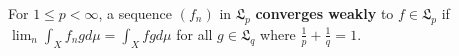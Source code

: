 For $1 \leq p < \infty$, a sequence $(f_n)$ in $\mathfrak{L}_p$ \textbf{converges weakly} to $f \in \mathfrak{L}_p$ if $\lim_n \int_X f_n g d\mu = \int_X f g d\mu$ for all $g \in \mathfrak{L}_q$ where $\frac{1}{p} + \frac{1}{q} = 1$.
